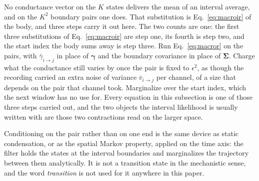 \begin{appendixbox}
No conductance vector on the $K$ states delivers the mean of an interval average, and on the
$K^2$ boundary pairs one does. That substitution is Eq.~\ref{eq:macroir} of the body, and three
steps carry it out here. The two counts are one: the first three substitutions of
Eq.~\ref{eq:macroir} are step one, its fourth is step two, and the start index the body sums away
is step three.
Run Eq.~\ref{eq:macror} on the pairs, with $\bar{\gamma}_{i\to j}$ in place of
$\boldsymbol{\gamma}$ and the boundary covariance in place of $\boldsymbol{\Sigma}$. Charge what the
conductance still varies by once the pair is fixed to $\epsilon^2$, as though the recording
carried an extra noise of variance $\bar{v}_{i\to j}$ per channel, of a size that
depends on the pair that channel took. Marginalize over the start index, which the next window
has no use for. Every equation in this subsection is one of those three steps carried out, and
the two objects the interval likelihood is usually written with are those two contractions
read on the larger space.

Conditioning on the pair rather than on one end is the same device as static condensation, or as
the spatial Markov property, applied on the time axis: the filter holds the states at the interval
boundaries and marginalizes the trajectory between them analytically. It is not a transition state
in the mechanistic sense, and the word \emph{transition} is not used for it anywhere in this paper.


\end{appendixbox}
